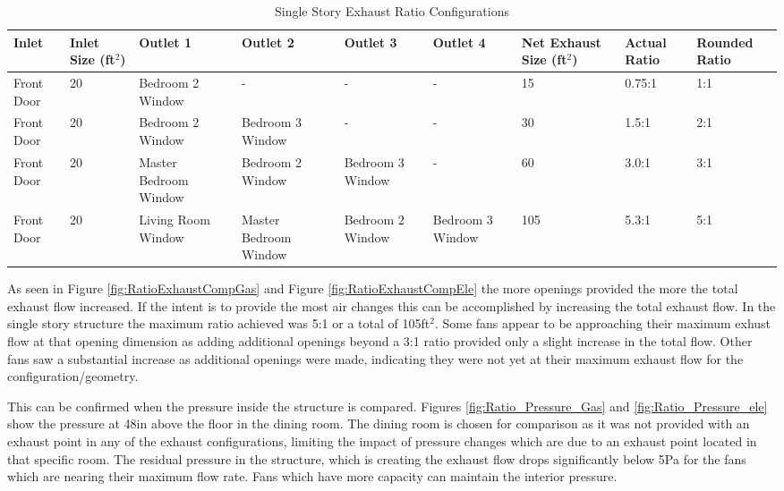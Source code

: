\documentclass{article}
\begin{document}
\begin{table}[H]
	\centering
	\caption {Single Story Exhaust Ratio Configurations}
	\begin{tabular}{|C{.5in}|C{.6in}|C{.7in}|C{.7in}|C{.7in}|C{.7in}|C{.6in}|C{.5in}|C{.5in}|}
		\hline
		Inlet & Inlet Size (ft$^2$) & Outlet 1 & Outlet 2 & Outlet 3 & Outlet 4 & Net Exhaust Size (ft$^2$) & Actual Ratio & Rounded Ratio \\ \hline \hline
		Front Door & 20 & Bedroom 2 Window & - & - & - & 15 & 0.75:1 & 1:1 \\ \hline
		Front Door & 20 & Bedroom 2 Window & Bedroom 3 Window & - & - & 30 & 1.5:1 & 2:1 \\ \hline
		Front Door & 20 & Master Bedroom Window & Bedroom 2 Window & Bedroom 3 Window & - & 60 & 3.0:1 & 3:1 \\ \hline
		Front Door & 20 & Living Room Window & Master Bedroom Window & Bedroom 2 Window & Bedroom 3 Window & 105 & 5.3:1 & 5:1 \\ \hline
	\end{tabular}
	\label{table:RatioExhaustComp}
\end{table}

As seen in Figure \ref{fig:RatioExhaustCompGas} and Figure \ref{fig:RatioExhaustCompEle} the more openings provided the more the total exhaust flow increased. If the intent is to provide the most air changes this can be accomplished by increasing the total exhaust flow. In the single story structure the maximum ratio achieved was 5:1 or a total of 105ft$^2$. Some fans appear to be approaching their maximum exhust flow at that opening dimension as adding additional openings beyond a 3:1 ratio provided only a slight increase in the total flow. Other fans saw a substantial increase as additional openings were made, indicating they were not yet at their maximum exhaust flow for the configuration/geometry. 

This can be confirmed when the pressure inside the structure is compared. Figures \ref{fig:Ratio_Pressure_Gas} and \ref{fig:Ratio_Pressure_ele} show the pressure at 48in above the floor in the dining room. The dining room is chosen for comparison as it was not provided with an exhaust point in any of the exhaust configurations, limiting the impact of pressure changes which are due to an exhaust point located in that specific room. The residual pressure in the structure, which is creating the exhaust flow drops significantly below 5Pa for the fans which are nearing their maximum flow rate. Fans which have more capacity can maintain the interior pressure. 
\end{document}
